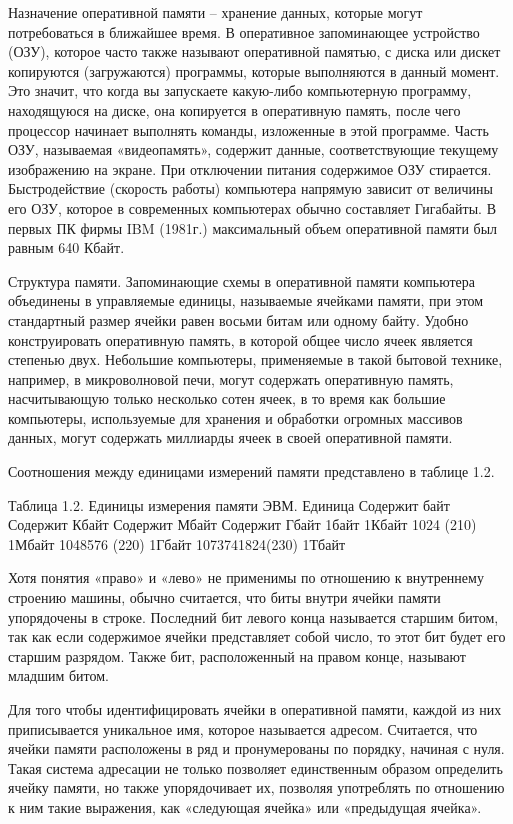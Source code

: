 \documentclass[a4paper]{article}
\begin{document}
Назначение оперативной памяти – хранение данных, которые могут потребоваться в ближайшее время. В оперативное запоминающее устройство (ОЗУ), которое часто также называют оперативной памятью, с диска или дискет копируются (загружаются) программы, которые выполняются в данный момент. Это значит, что когда вы запускаете какую-либо компьютерную программу, находящуюся на диске, она копируется в оперативную память, после чего процессор начинает выполнять команды, изложенные в этой программе. Часть ОЗУ, называемая «видеопамять», содержит данные, соответствующие текущему изображению на экране. При отключении питания содержимое ОЗУ стирается. Быстродействие (скорость работы) компьютера напрямую зависит от величины его ОЗУ, которое в современных компьютерах обычно составляет Гигабайты. В первых ПК фирмы IBM (1981г.) максимальный объем оперативной памяти был равным 640 Кбайт.

Структура памяти. Запоминающие схемы в оперативной памяти компьютера объединены в управляемые единицы, называемые ячейками памяти, при этом стандартный размер ячейки равен восьми битам или одному байту. Удобно конструировать оперативную память, в которой общее число ячеек является степенью двух. Небольшие компьютеры, применяемые в такой бытовой технике, например, в микроволновой печи, могут содержать оперативную память, насчитывающую только несколько сотен ячеек, в то время как большие компьютеры, используемые для хранения и обработки огромных массивов данных, могут содержать миллиарды ячеек в своей оперативной памяти.

Соотношения между единицами измерений памяти представлено в таблице 1.2.

Таблица 1.2. Единицы измерения памяти ЭВМ.
Единица 	Содержит байт 	Содержит Кбайт 	Содержит Мбайт 	Содержит Гбайт
1байт
1Кбайт 	1024 (210)
1Мбайт 	1048576 (220)
1Гбайт 	1073741824(230)
1Тбайт

Хотя понятия «право» и «лево» не применимы по отношению к внутреннему строению машины, обычно считается, что биты внутри ячейки памяти упорядочены в строке. Последний бит левого конца называется старшим битом, так как если содержимое ячейки представляет собой число, то этот бит будет его старшим разрядом. Также бит, расположенный на правом конце, называют младшим битом.

Для того чтобы идентифицировать ячейки в оперативной памяти, каждой из них приписывается уникальное имя, которое называется адресом. Считается, что ячейки памяти расположены в ряд и пронумерованы по порядку, начиная с нуля. Такая система адресации не только позволяет единственным образом определить ячейку памяти, но также упорядочивает их, позволяя употреблять по отношению к ним такие выражения, как «следующая ячейка» или «предыдущая ячейка».
\end{document}
